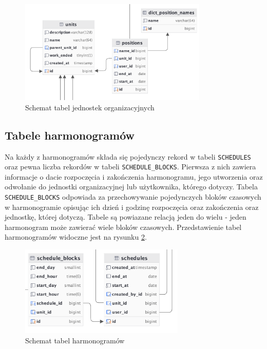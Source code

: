 \begin{figure}[H]
    \centering
    \includegraphics[width=0.8\textwidth]{graf/unitsTable.png}
    \caption{Schemat tabel jednostek organizacyjnych}
    \label{fig:organizationalUnitsTable}
\end{figure}

\subsection{Tabele harmonogramów}
\label{ss:harmonogramy}


Na każdy z harmonogramów składa się pojedynczy rekord w tabeli \texttt{SCHEDULES} oraz pewna liczba rekordów w tabeli \texttt{SCHEDULE\_BLOCKS}. Pierwsza z nich zawiera informacje o dacie rozpoczęcia i zakończenia harmonogramu, jego utworzenia oraz odwołanie do jednostki organizacyjnej lub użytkownika, którego dotyczy. Tabela \texttt{SCHEDULE\_BLOCKS} odpowiada za przechowywanie pojedynczych bloków czasowych w harmonogramie opisując ich dzień i godzinę rozpoczęcia oraz zakończenia oraz jednostkę, której dotyczą. Tabele są powiazane relacją jeden do wielu - jeden harmonogram może zawierać wiele bloków czasowych. Przedstawienie tabel harmonogramów widoczne jest na rysunku \ref{fig:schedulesTable}.

\begin{figure}[H]
    \centering
    \includegraphics[width=0.7\textwidth]{graf/scheduleTable.png}
    \caption{Schemat tabel harmonogramów}
    \label{fig:schedulesTable}
\end{figure}

